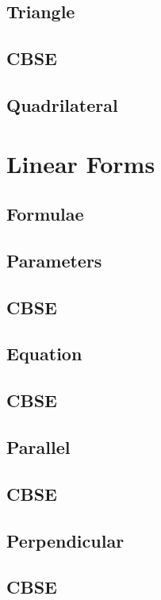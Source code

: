 \documentclass[journal]{IEEEtran}
\begin{document}
\subsection{Triangle}

\subsection{CBSE}

\subsection{Quadrilateral}

\newpage
\section{Linear Forms}
\subsection{Formulae}

\subsection{Parameters}

\subsection{CBSE}

\subsection{Equation }

\subsection{CBSE}

\subsection{Parallel}

\subsection{CBSE}

\subsection{Perpendicular}

\subsection{CBSE}

\end{document}
